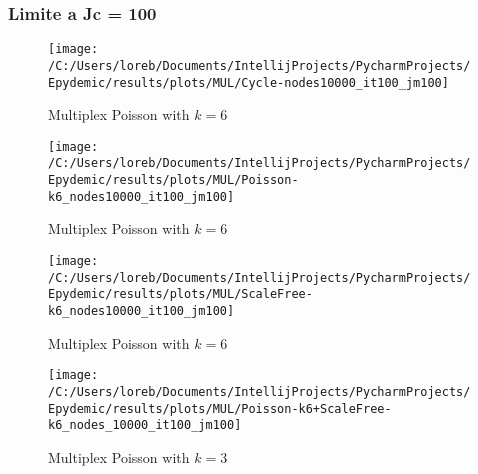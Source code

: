     \subsubsection{Limite a Jc = 100}
    \begin{figure}[H]
        \texttt{[image: /C:/Users/loreb/Documents/IntellijProjects/PycharmProjects/Epydemic/results/plots/MUL/Cycle-nodes10000\_it100\_jm100]}\caption{Multiplex Poisson with $k=6$}
        \label{fig:multi_poisson_k_6_2}
    \end{figure}
    \begin{figure}[H]
        \texttt{[image: /C:/Users/loreb/Documents/IntellijProjects/PycharmProjects/Epydemic/results/plots/MUL/Poisson-k6\_nodes10000\_it100\_jm100]}\caption{Multiplex Poisson with $k=6$}
        \label{fig:multi_poisson_k_6_3}
    \end{figure}
    \begin{figure}[H]
        \texttt{[image: /C:/Users/loreb/Documents/IntellijProjects/PycharmProjects/Epydemic/results/plots/MUL/ScaleFree-k6\_nodes10000\_it100\_jm100]}\caption{Multiplex Poisson with $k=6$}
        \label{fig:multi_poisson_k_6_4}
    \end{figure}
    \begin{figure}[H]
        \texttt{[image: /C:/Users/loreb/Documents/IntellijProjects/PycharmProjects/Epydemic/results/plots/MUL/Poisson-k6+ScaleFree-k6\_nodes\_10000\_it100\_jm100]}\caption{Multiplex Poisson with $k=3$}
        \label{fig:multi_poisson_k_3_2}
    \end{figure}
